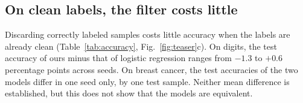 \subsection{On clean labels, the filter costs little}\label{sec:results_clean}

Discarding correctly labeled samples costs little accuracy when the labels are already clean (Table~\ref{tab:accuracy}, Fig.~\ref{fig:teaser}c). On digits, the test accuracy of ours minus that of logistic regression ranges from $-1.3$ to $+0.6$ percentage points across seeds. On breast cancer, the test accuracies of the two models differ in one seed only, by one test sample. Neither mean difference is established, but this does not show that the models are equivalent.
